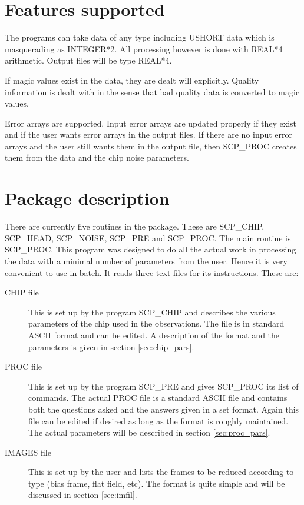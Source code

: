 \section{Features supported}

The programs can take data of any type including USHORT data which is 
masquerading as INTEGER*2. All processing however is done with REAL*4
arithmetic.  Output files will be type REAL*4.

If magic values exist in the data, they are dealt will explicitly. Quality
information is dealt with in the sense that bad quality data is converted to
magic values.

Error arrays are supported.  Input error arrays are updated properly if they
exist and if the user wants error arrays in the output files.  If there are no
input error arrays and the user still wants them in the output file, then
SCP\_PROC creates them from the data and the chip noise parameters.

\section{Package description}

There are currently five routines in the package.  These are SCP\_CHIP,
SCP\_HEAD, SCP\_NOISE, SCP\_PRE and SCP\_PROC. The main routine is SCP\_PROC. 
This program was designed to do all the actual work in processing the data with
a minimal number of parameters from the user.  Hence it is very convenient to
use in batch. It reads three text files for its instructions. These are:

\begin{description}

\item [CHIP file]This is set up by the program SCP\_CHIP and describes the
various parameters of the chip used in the observations. The file is in
standard ASCII format and can be edited.  A description of the format and the
parameters is given in section \ref{sec:chip_pars}.

\item [PROC file] This is set up by the program SCP\_PRE and gives SCP\_PROC
its list of commands.  The actual PROC file is a standard ASCII file and
contains both the questions asked and  the answers given in a set format. Again
this file can be edited if desired as long as the format is roughly maintained.
The actual parameters will be described in section \ref{sec:proc_pars}.

\item [IMAGES file]This is set up by the user and lists the frames to be
reduced according to type (bias frame, flat field, etc). The format is quite
simple and will be discussed in section \ref{sec:imfil}. 

\end{description}

